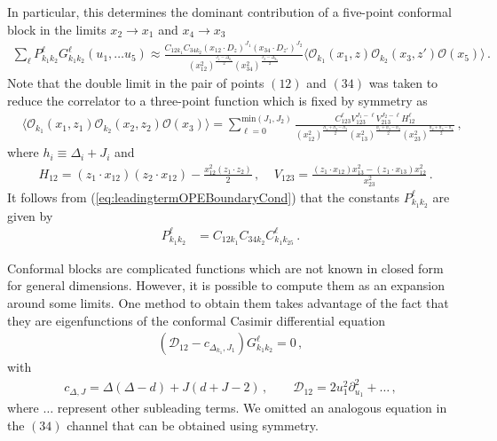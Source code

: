 In particular, this determines the dominant contribution of a five-point conformal block  in the limits $x_{2}\rightarrow x_1$ and $x_4\rightarrow x_3$
\begin{align}
  \sum_{\ell} P_{k_1k_2}^{\ell}G_{k_1k_2}^{\ell}(u_1,\dots u_5) \approx \tfrac{C_{12k_1}C_{34k_2} (x_{12}\cdot D_{z})^{J_1}(x_{34}\cdot D_{z'})^{J_2}}{(x_{12}^2)^{\frac{J_{1}-\Delta_{k_1}}{2}} (x_{34}^2)^{\frac{J_{2}-\Delta_{k_2}}{2}}} \langle \mathcal{O}_{k_1}(x_1,z)\mathcal{O}_{k_2}(x_3,z') \mathcal{O}(x_5) \rangle\,.
  \label{eq:leadingtermOPEBoundaryCond}
\end{align}
Note that the double limit in the pair of points $(12)$ and $(34)$ was taken to reduce the correlator to a three-point function which is fixed by symmetry as
\begin{align}
   & \langle \mathcal{O}_{k_1}(x_1,z_1)\mathcal{O}_{k_2}(x_2,z_2) \mathcal{O}(x_3) \rangle  = \sum_{\ell=0}^{\textrm{min}(J_1,J_2)}\frac{C_{123}^{\ell} V_{123}^{J_1-\ell} V_{213}^{J_2-\ell} H_{12}^{\ell}}{(x_{12}^2)^{\frac{h_1+h_2-h_3}{2}} (x_{13}^2)^{\frac{h_1+h_3-h_2}{2}} (x_{23}^2)^{\frac{h_2+h_3-h_1}{2}}   } \,,
  \label{eq:threepontfunction}
\end{align}
where $h_i\equiv \Delta_i+J_i$ and
\begin{align}
   & H_{12} = (z_1\cdot x_{12})(z_2\cdot x_{12})- \frac{x_{12}^2  (z_1\cdot z_2)}{2}\,, \ \ \ \ \ V_{123} = \frac{(z_1\cdot x_{12} )x_{13}^2- (z_1\cdot x_{13})x_{12}^2}{x_{23}^2}\,.
\end{align}
It follows  from (\ref{eq:leadingtermOPEBoundaryCond}) that the constants $P_{k_1k_2}^{\ell}$ are given by
\begin{align}
  P_{k_1k_2}^{\ell} & =C_{12k_1}C_{34k_2}C_{k_1k_25}^{\ell} \,.
  \label{eq:OPE_coeffs}
\end{align}

Conformal blocks are complicated functions which are not known in closed form for general dimensions.
However, it is possible to compute them as an expansion around some limits.
One method to obtain them takes advantage of the fact that they are eigenfunctions of the conformal Casimir differential equation
\begin{align}
  \left(\mathcal{D}_{12} -c_{\Delta_{k_1},J_1}\right) G_{k_1k_2}^{\ell}=0\,,
\end{align}
with
\begin{align}
  c_{\Delta,J} =\Delta  (\Delta -d)+J (d+J-2)\,, \qquad
  \mathcal{D}_{12} = 2u_1^2\partial_{u_1}^2+\dots\,,
\end{align}
where $\dots$ represent other subleading terms.
We omitted an analogous equation in the $(34)$ channel that can be obtained using symmetry.

